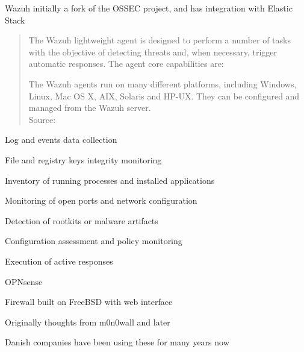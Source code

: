 \documentclass[Screen16to9,17pt]{foils}
\begin{document}
\begin{list2}
\item Wazuh initially a fork of the OSSEC project, and has integration with Elastic Stack
\end{list2}



\begin{quote}\small
The Wazuh lightweight agent is designed to perform a number of tasks with the objective of detecting threats and, when necessary, trigger automatic responses. The agent core capabilities are:

The Wazuh agents run on many different platforms, including Windows, Linux, Mac OS X, AIX, Solaris and HP-UX. They can be configured and managed from the Wazuh server.\\
Source: 
\end{quote}

\begin{list2}
\item Log and events data collection
\item File and registry keys integrity monitoring
\item Inventory of running processes and installed applications
\item Monitoring of open ports and network configuration
\item Detection of rootkits or malware artifacts
\item Configuration assessment and policy monitoring
\item Execution of active responses
\end{list2}




\begin{list1}
\item OPNsense 
\item Firewall built on FreeBSD with web interface
\item Originally thoughts from m0n0wall and later \\
\item Danish companies have been using these for many years now
\end{list1}

\end{document}
